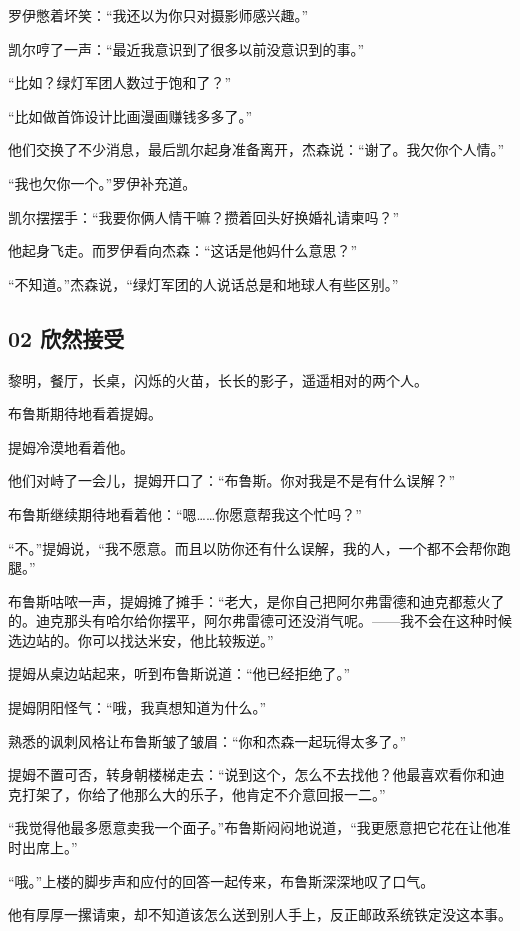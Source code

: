 \documentclass[../main]{subfiles}
\begin{document}
罗伊憋着坏笑：“我还以为你只对摄影师感兴趣。”

凯尔哼了一声：“最近我意识到了很多以前没意识到的事。”

“比如？绿灯军团人数过于饱和了？”

“比如做首饰设计比画漫画赚钱多多了。”

他们交换了不少消息，最后凯尔起身准备离开，杰森说：“谢了。我欠你个人情。”

“我也欠你一个。”罗伊补充道。

凯尔摆摆手：“我要你俩人情干嘛？攒着回头好换婚礼请柬吗？”

他起身飞走。而罗伊看向杰森：“这话是他妈什么意思？”

“不知道。”杰森说，“绿灯军团的人说话总是和地球人有些区别。”

\hypertarget{02-ux6b23ux7136ux63a5ux53d7}{%
    \subsection{02 欣然接受}\label{02-ux6b23ux7136ux63a5ux53d7}}

黎明，餐厅，长桌，闪烁的火苗，长长的影子，遥遥相对的两个人。

布鲁斯期待地看着提姆。

提姆冷漠地看着他。

他们对峙了一会儿，提姆开口了：“布鲁斯。你对我是不是有什么误解？”

布鲁斯继续期待地看着他：“嗯……你愿意帮我这个忙吗？”

“不。”提姆说，“我不愿意。而且以防你还有什么误解，我的人，一个都不会帮你跑腿。”

布鲁斯咕哝一声，提姆摊了摊手：“老大，是你自己把阿尔弗雷德和迪克都惹火了的。迪克那头有哈尔给你摆平，阿尔弗雷德可还没消气呢。——我不会在这种时候选边站的。你可以找达米安，他比较叛逆。”

提姆从桌边站起来，听到布鲁斯说道：“他已经拒绝了。”

提姆阴阳怪气：“哦，我真想知道为什么。”

熟悉的讽刺风格让布鲁斯皱了皱眉：“你和杰森一起玩得太多了。”

提姆不置可否，转身朝楼梯走去：“说到这个，怎么不去找他？他最喜欢看你和迪克打架了，你给了他那么大的乐子，他肯定不介意回报一二。”

“我觉得他最多愿意卖我一个面子。”布鲁斯闷闷地说道，“我更愿意把它花在让他准时出席上。”

“哦。”上楼的脚步声和应付的回答一起传来，布鲁斯深深地叹了口气。

他有厚厚一摞请柬，却不知道该怎么送到别人手上，反正邮政系统铁定没这本事。
\end{document}
